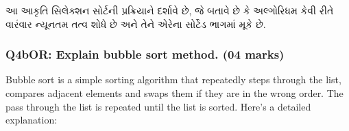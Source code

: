 \begin{Shaded}
\begin{Highlighting}[]
\end{Highlighting}
\end{Shaded}

આ આકૃતિ સિલેક્શન સોર્ટની પ્રક્રિયાને દર્શાવે છે, જે બતાવે છે કે અલ્ગોરિધમ કેવી રીતે
વારંવાર ન્યૂનતમ તત્વ શોધે છે અને તેને એરેના સોર્ટેડ ભાગમાં મૂકે છે.

\hypertarget{q4bor-explain-bubble-sort-method.-04-marks}{%
\subsubsection{Q4bOR: Explain bubble sort method. (04
marks)}\label{q4bor-explain-bubble-sort-method.-04-marks}}

Bubble sort is a simple sorting algorithm that repeatedly steps through
the list, compares adjacent elements and swaps them if they are in the
wrong order. The pass through the list is repeated until the list is
sorted. Here's a detailed explanation:

